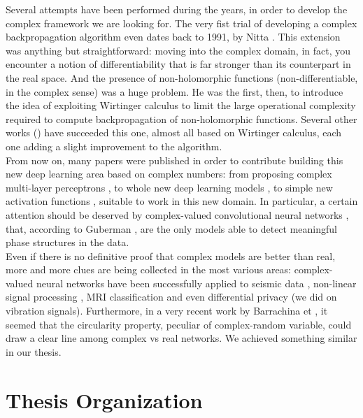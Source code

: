 \documentclass[../main.tex]{subfiles}
\begin{document}
Several attempts have been performed during the years, in order to develop the complex framework we are looking for. The very fist trial of developing a complex backpropagation algorithm even dates back to 1991, by Nitta \cite{Nitta_complexBP}. This extension was anything but straightforward: moving into the complex domain, in fact, you encounter a notion of differentiability that is far stronger than its counterpart in the real space. And the presence of non-holomorphic functions (non-differentiable, in the complex sense) was a huge problem. He was the first, then, to introduce the idea of exploiting Wirtinger calculus to limit the large operational complexity required to compute backpropagation of non-holomorphic functions. Several other works (\cite{kreutzdelgado2009complex, amin_wirtinger, Hualiang_nonlinear}) have succeeded this one, almost all based on Wirtinger calculus, each one adding a slight improvement to the algorithm.\\
From now on, many papers were published in order to contribute building this new deep learning area based on complex numbers: from proposing complex multi-layer perceptrons \cite{complex_mlp}, to whole new deep learning models \cite{trabelsi2018deep}, to simple new activation functions \cite{scardapane2018complexvalued, virtue2017better}, suitable to work in this new domain. In particular, a certain attention should be deserved by complex-valued convolutional neural networks \cite{hirose_cvnn}, that, according to Guberman \cite{guberman2016complex}, are the only models able to detect meaningful phase structures in the data.\\
Even if there is no definitive proof that complex models are better than real, more and more clues are being collected in the most various areas: complex-valued neural networks have been successfully applied to seismic data \cite{Dramsch_seismic}, non-linear signal processing \cite{complex_mlp}, MRI classification \cite{virtue2017better} and even differential privacy \cite{ziller2021complexvalued} (we did on vibration signals). Furthermore, in a very recent work by Barrachina et \cite{barrachina2021complexvalued}, it seemed that the circularity property, peculiar of complex-random variable, could draw a clear line among complex vs real networks. We achieved something similar in our thesis.\\


\section{Thesis Organization}
\end{document}
